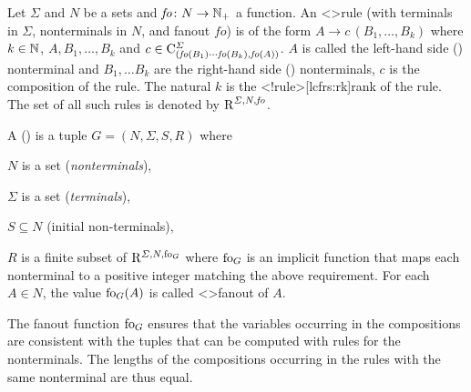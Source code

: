 \documentclass[../../document.tex]{subfiles}
\begin{document}
    \begin{definition}
        Let \(\varSigma\) and \(N\) be a sets and \(\mathit{fo}\colon N \to \mathbb{N}_+\) a function.
        An  <\lcfrs>{rule} (with terminals in \(\varSigma\), nonterminals in \(N\), and fanout \(\mathit{fo}\)) is of the form \(A \to c\,(B_1, \ldots, B_k)\) where \(k \in \mathbb{N}\), \(A, B_1, \ldots, B_k\) and \(c \in \mathrm{C}^\varSigma_{(\mathit{fo}(B_1) \cdots \mathit{fo}(B_k), \mathit{fo}(A))}\).
        \(A\) is called the left-hand side () nonterminal and \(B_1, \ldots B_k\) are the right-hand side () nonterminals, \(c\) is the composition of the rule.
        The natural \(k\) is the <\lcfrs!rule>[lcfrs:rk]{rank} of the rule.
        The set of all such  rules is denoted by \(\operatorname{R}^{\varSigma, N, \mathit{fo}}\).

        A  ()%
        is a tuple \(G=(N, \varSigma, S, R)\) where
        \begin{compactenum}
            \item \(N\) is a set (\emph{nonterminals}),
            \item \(\varSigma\) is a set (\emph{terminals}),
            \item \(S \subseteq N\) (initial non-terminals),
            \item \(R\) is a finite subset of \(\mathrm R^{\varSigma, N, \operatorname{fo}_G}\) where \(\operatorname{fo}_G\) is an implicit function that maps each nonterminal to a positive integer matching the above requirement. For each \(A \in N\), the value \(\operatorname{fo}_G(A)\) is called <\lcfrs>{fanout} of \(A\).
        \end{compactenum}
    \end{definition}

    The fanout function \(\operatorname{fo}_G\) ensures that the variables occurring in the compositions are consistent with the tuples that can be computed with rules for the  nonterminals.
    The lengths of the compositions occurring in the rules with the same  nonterminal are thus equal.
\end{document}
